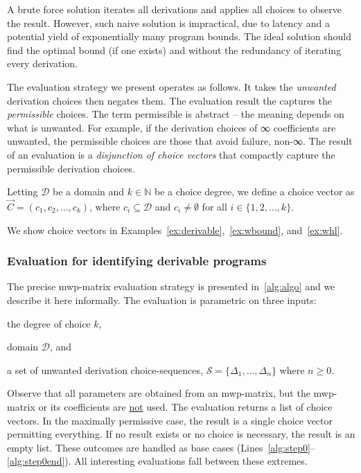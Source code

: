 A brute force solution iterates all derivations and applies all choices to observe the result.
However, such naive solution is impractical, due to latency and a potential yield of exponentially many program bounds.
The ideal solution should find the optimal bound (if one exists) and without the redundancy of iterating every derivation.

The evaluation strategy we present operates as follows.
It takes the \emph{unwanted} derivation choices then negates them.
The evaluation result the captures the \emph{permissible} choices.
The term permissible is abstract -- the meaning depends on what is unwanted.
For example, if the derivation choices of ∞ coefficients are unwanted,
the permissible choices are those that avoid failure, \ie non-∞.
The result of an evaluation is a \emph{disjunction of choice vectors} that compactly capture the permissible derivation choices.

\begin{definition}
    Letting \( \mathcal{D} \) be a domain and \( k \in \mathbb{N} \) be a choice degree,
    we define a choice vector as \( \vec{C} = (c_1, c_2, \ldots, c_k) \),
    where \( c_i \subseteq \mathcal{D} \) and \( c_i \neq \emptyset \) for all \( i \in \{1, 2, \ldots, k\} \).
\end{definition}
We show choice vectors in Examples~\ref{ex:derivable},~\ref{ex:wbound}, and~\ref{ex:whl}.

\subsubsection{Evaluation for identifying derivable programs}
\label{subsec:eval}

The precise mwp-matrix evaluation strategy is presented in~\autoref{alg:algo} and we describe it here informally.
The evaluation is parametric on three inputs:
\begin{enumerate*}[label=(\roman*)]
\item the degree of choice \(k\),
\item domain \(\mathcal{D}\), and
\item a set of unwanted derivation choice-sequences, \(\mathcal{S} = \{\Delta_1,\ldots,\Delta_n\}\) where \(n \geq 0\).
\end{enumerate*}
Observe that all parameters are obtained from an mwp-matrix, but the mwp-matrix or its coefficients are \underline{not} used.
The evaluation returns a list of choice vectors.
In the maximally permissive case, the result is a single choice vector permitting everything.
If no result exists or no choice is necessary, the result is an empty list.
These outcomes are handled as base cases (Lines~\ref{alg:step0}--\ref{alg:step0end}).
All interesting evaluations fall between these extremes.

